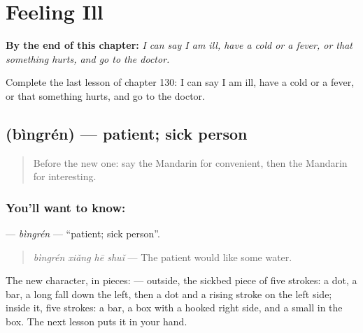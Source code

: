 
\chapter{Feeling Ill}
\label{ch:zh-feeling-ill}

\begin{chapteropening}
\textbf{By the end of this chapter:} \emph{I can say I am ill, have a cold or a fever, or that something hurts, and go to the doctor.}

Complete the last lesson of chapter 130: I can say I am ill, have a cold or a fever, or that something hurts, and go to the doctor.
\end{chapteropening}

\section[\texorpdfstring{\zh{病人} (bìngrén)}{病人 (bìngrén)}]{ (bìngrén) — patient; sick person}

\label{lesson:ZH-C130-bingren}



\begin{quote}
Before the new one: say the Mandarin for convenient, then the Mandarin for interesting.
\end{quote}

\subsection*{You'll want to know: }
\textbf{} — \emph{bìngrén} — \textquotedblleft{}patient; sick person\textquotedblright{}.

\begin{quote}
\textbf{} \emph{bìngrén xiǎng hē shuǐ} — The patient would like some water.
\end{quote}

The new character, in pieces:  — outside, the sickbed piece of five strokes: a dot, a bar, a long fall down the left, then a dot and a rising stroke on the left side; inside it, five strokes: a bar, a box with a hooked right side, and a small  in the box. The next lesson puts it in your hand.

